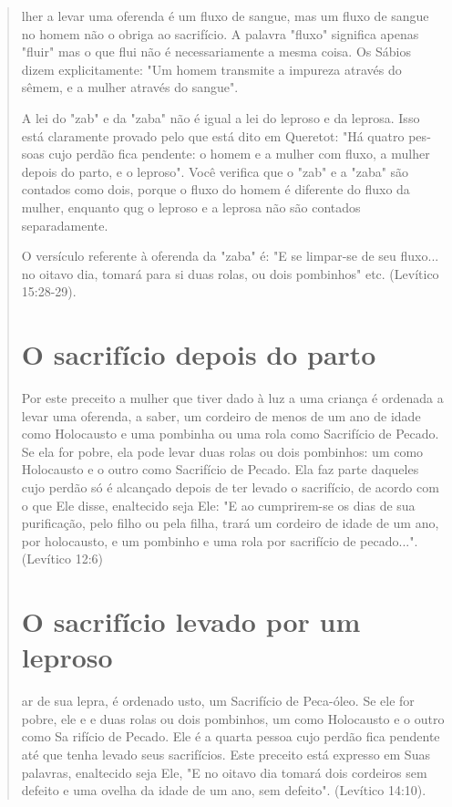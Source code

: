 \begin{quote}


lher a levar uma oferenda é um fluxo de sangue, mas um fluxo de sangue
no homem não o obriga ao sacrifício. A palavra "fluxo" significa apenas
"fluir" mas o que flui não é necessariamente a mesma coisa. Os Sábios
dizem explicita­mente: "Um homem transmite a impureza através do sêmem,
e a mulher atra­vés do sangue".

A lei do "zab" e da "zaba" não é igual a lei do leproso e da leprosa.
Isso está claramente provado pelo que está dito em Queretot: "Há quatro
pes­soas cujo perdão fica pendente: o homem e a mulher com fluxo, a
mulher de­pois do parto, e o leproso". Você verifica que o "zab" e a
"zaba" são contados como dois, porque o fluxo do homem é diferente do
fluxo da mulher, enquan­to qug o leproso e a leprosa não são contados
separadamente.

O versículo referente à oferenda da "zaba" é: "E se limpar-se de seu
fluxo... no oitavo dia, tomará para si duas rolas, ou dois pombinhos"
etc. (Leví­tico 15:28-29).

\section{O sacrifício depois do parto}

Por este preceito a mulher que tiver dado à luz a uma criança é
orde­nada a levar uma oferenda, a saber, um cordeiro de menos de um ano
de idade como Holocausto e uma pombinha ou uma rola como Sacrifício de
Pecado. Se ela for pobre, ela pode levar duas rolas ou dois pombinhos:
um como Holo­causto e o outro como Sacrifício de Pecado. Ela faz parte
daqueles cujo perdão só é alcançado depois de ter levado o sacrifício,
de acordo com o que Ele disse, enaltecido seja Ele: "E ao cumprirem-se
os dias de sua purificação, pelo filho ou pela filha, trará um cordeiro
de idade de um ano, por holocausto, e um pom­binho e uma rola por
sacrifício de pecado...". (Levítico 12:6)

\section{O sacrifício levado por um leproso}

ar de sua lepra, é ordenado usto, um Sacrifício de Peca-óleo. Se ele for
pobre, ele e e duas rolas ou dois pombi­nhos, um como Holocausto e o
outro como Sa rifício de Pecado. Ele é a quarta pessoa cujo perdão fica
pendente até que tenha levado seus sacrifícios. Este pre­ceito está
expresso em Suas palavras, enaltecido seja Ele, "E no oitavo dia to­mará
dois cordeiros sem defeito e uma ovelha da idade de um ano, sem
defei­to". (Levítico 14:10).


\end{quote}
